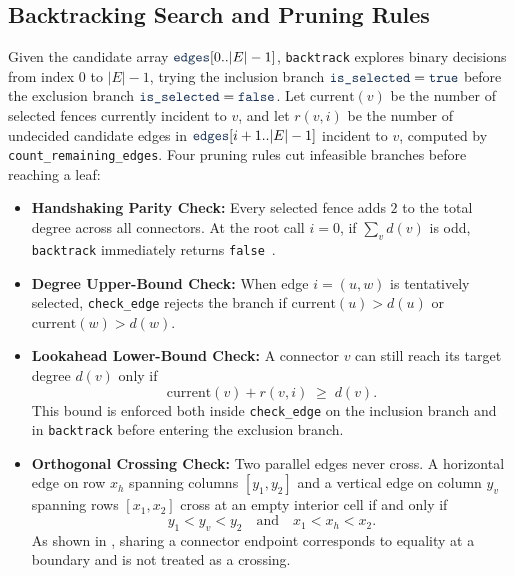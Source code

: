 \documentclass[10pt, a4paper]{article}
\newcommand{\code}[1]{\texttt{\color{primary!90!black}#1}}
\newcommand{\id}[1]{\ensuremath{\mathrm{#1}}}
\begin{document}
\subsection{Backtracking Search and Pruning Rules}
Given the candidate array $\code{edges}[0..|E|-1]$, \code{backtrack} explores binary decisions from index $0$ to $|E|-1$, trying the inclusion branch $\code{is\_selected} = \code{true}$ before the exclusion branch $\code{is\_selected} = \code{false}$. Let $\id{current}(v)$ be the number of selected fences currently incident to $v$, and let $r(v, i)$ be the number of undecided candidate edges in $\code{edges}[i+1..|E|-1]$ incident to $v$, computed by \code{count\_remaining\_edges}. Four pruning rules cut infeasible branches before reaching a leaf:
\begin{itemize}
  \item \textbf{\color{primary}Handshaking Parity Check:} Every selected fence adds $2$ to the total degree across all connectors. At the root call $i = 0$, if $\sum_{v} d(v)$ is odd, \code{backtrack} immediately returns \code{false}~\cite{cormen2022}.
  \item \textbf{\color{primary}Degree Upper-Bound Check:} When edge $i = (u, w)$ is tentatively selected, \code{check\_edge} rejects the branch if $\id{current}(u) > d(u)$ or $\id{current}(w) > d(w)$.
  \item \textbf{\color{primary}Lookahead Lower-Bound Check:} A connector $v$ can still reach its target degree $d(v)$ only if
  \[
    \id{current}(v) + r(v, i) \;\ge\; d(v).
  \]
  This bound is enforced both inside \code{check\_edge} on the inclusion branch and in \code{backtrack} before entering the exclusion branch.
  \item \textbf{\color{primary}Orthogonal Crossing Check:} Two parallel edges never cross. A horizontal edge on row $x_h$ spanning columns $[y_1, y_2]$ and a vertical edge on column $y_v$ spanning rows $[x_1, x_2]$ cross at an empty interior cell if and only if
  \[
    y_1 < y_v < y_2 \quad\text{and}\quad x_1 < x_h < x_2.
  \]
  As shown in , sharing a connector endpoint corresponds to equality at a boundary and is not treated as a crossing.
\end{itemize}
\end{document}

